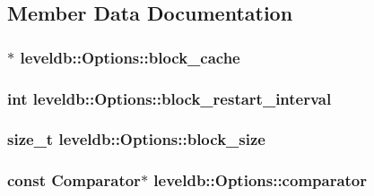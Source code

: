 \subsection{Member Data Documentation}
\hypertarget{structleveldb_1_1_options_a4e87749ebac1ba28dff6bb63eb2059e5}{
\subsubsection[{block\-\_\-cache}]{$\ast$ leveldb\-::\-Options\-::block\-\_\-cache}}\label{structleveldb_1_1_options_a4e87749ebac1ba28dff6bb63eb2059e5}
\hypertarget{structleveldb_1_1_options_ac71d66ae44e481edc3922d3a139c30b4}{
\subsubsection[{block\-\_\-restart\-\_\-interval}]{\setlength{\rightskip}{0pt plus 5cm}int leveldb\-::\-Options\-::block\-\_\-restart\-\_\-interval}}\label{structleveldb_1_1_options_ac71d66ae44e481edc3922d3a139c30b4}
\hypertarget{structleveldb_1_1_options_a715c7941b43db641e76e598aa9ab52a0}{
\subsubsection[{block\-\_\-size}]{\setlength{\rightskip}{0pt plus 5cm}size\-\_\-t leveldb\-::\-Options\-::block\-\_\-size}}\label{structleveldb_1_1_options_a715c7941b43db641e76e598aa9ab52a0}
\hypertarget{structleveldb_1_1_options_a7522fbf79de73c4f73ef8d9392e8c80b}{
\subsubsection[{comparator}]{\setlength{\rightskip}{0pt plus 5cm}const {\bf Comparator}$\ast$ leveldb\-::\-Options\-::comparator}}\label{structleveldb_1_1_options_a7522fbf79de73c4f73ef8d9392e8c80b}
